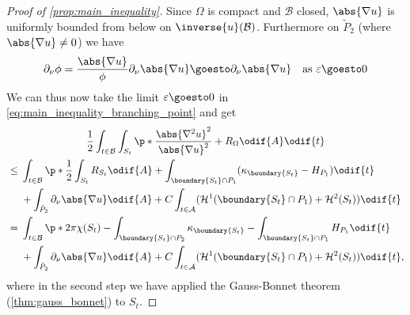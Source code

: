 \documentclass[titlepage,numbers=noenddot,oneside,%
cleardoublepage=empty,paper=a4,fontsize=11pt,%
english,%
]{scrartcl}
\begin{document}
{\begin{proof}[Proof of \cref{prop:main_inequality}]
    Since \( \Omega \) is compact and \( \mathcal{B} \) closed, \( \abs{\nabla u} \) is uniformly bounded from below on \( \inverse{u}(\mathcal{B}) \). Furthermore on \( \tilde{P}_2 \) (where \( \abs{\nabla u}\neq 0 \)) we have
    \begin{equation*}
        \partial_\nu \phi=\frac{\abs{\nabla u}}{\phi}\partial_{\nu}\abs{\nabla u}\goesto \partial_{\nu}\abs{\nabla u}\quad \text{as \( \varepsilon\goesto 0 \)}
    \end{equation*} 
    We can thus now take the limit \( \varepsilon\goesto 0 \) in \cref{eq:main_inequality_branching_point} and get
    \begin{multline}
        \frac{1}{2}\int_{t\in \mathcal{B}}\int_{S_t}\p*{\frac{\abs{\nabla^2 u}^2}{\abs{\nabla u}^2}+R_{\Omega}}\odif{A}\odif{t}\\
        \begin{aligned}[t]&\leq 
            \begin{aligned}[t]
                &\int_{t\in \mathcal{B}}\p*{\frac{1}{2}\int_{S_t}R_{S_t}\odif{A}+\int_{\boundary{S_t}\cap P_1}(\kappa_{\boundary{S_t}}-H_{P_1})} \odif{t}\\
                &+\int_{\tilde{P}_2}\partial_{\nu}\abs{\nabla u}\odif{A}+C\int_{t\in \mathcal{A}}(\mathcal{H}^1(\boundary{S_t}\cap P_1)+\mathcal{H}^2(S_t))\odif{t}
            \end{aligned}\\
            &=\begin{aligned}[t]
            &\int_{t\in \mathcal{B}}\p*{2\pi \chi(S_t)-\int_{\boundary{S_t}\cap P_2}\kappa_{\boundary{S_t}}-\int_{\boundary{S_t}\cap P_1}H_{P_1}} \odif{t}\\
            &+\int_{\tilde{P}_2}\partial_{\nu}\abs{\nabla u}\odif{A}+C\int_{t\in \mathcal{A}}(\mathcal{H}^1(\boundary{S_t}\cap P_1)+\mathcal{H}^2(S_t))\odif{t},
        \end{aligned}
        \end{aligned} \label{eq:inequality_with_critical_values_removed}
    \end{multline}
    where in the second step we have applied the Gauss-Bonnet theorem (\cref{thm:gauss_bonnet}) to \( S_t \).
    


\end{proof}}
\end{document}
